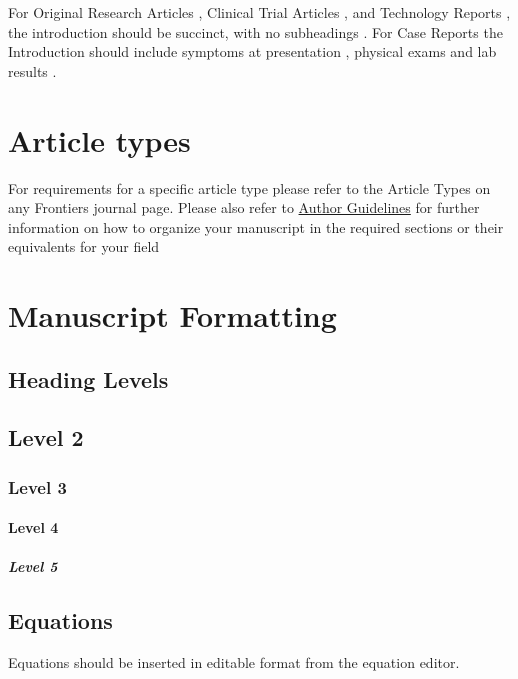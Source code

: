 \documentclass[utf8]{frontiersSCNS} %
\begin{document}
For Original Research Articles \citep{conference}, Clinical Trial Articles \citep{article}, and Technology Reports \citep{patent}, the introduction should be succinct, with no subheadings \citep{book}. For Case Reports the Introduction should include symptoms at presentation \citep{chapter}, physical exams and lab results \citep{dataset}.



\section{Article types}

For requirements for a specific article type please refer to the Article Types on any Frontiers journal page. Please also refer to  \href{http://home.frontiersin.org/about/author-guidelines#Sections}{Author Guidelines} for further information on how to organize your manuscript in the required sections or their equivalents for your field


\section{Manuscript Formatting}

\subsection{Heading Levels}


\subsection{Level 2}
\subsubsection{Level 3}
\paragraph{Level 4}
\subparagraph{Level 5}

\subsection{Equations}
Equations should be inserted in editable format from the equation editor.
\end{document}
